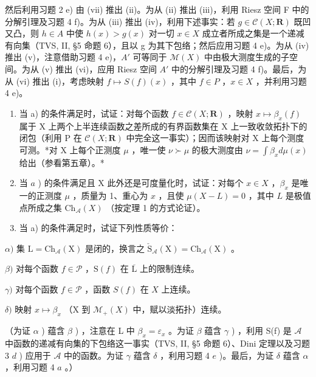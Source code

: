 然后利用习题 2 e) 由 (vii) 推出 (ii)。为从 (ii) 推出 (iii)，利用 Riesz 空间 F 中的分解引理及习题 4 f)。为从 (iii) 推出 (iv)，利用下述事实：若 \(g \in \mathcal{C}(X; \mathbf{R})\) 既凹又凸，则 \(h \in A\) 中使 \(h(x) > g(x)\) 对一切 \(x \in X\) 成立者所成之集是一个递减有向集（TVS, II, §5 命题 6），且以 g 为其下包络；然后应用习题 4 e)。为从 (iv) 推出 (v)，注意借助习题 4 e)，\(A'\) 可等同于 \(\mathcal{M}(X)\) 中由极大测度生成的子空间。为从 (v) 推出 (vi)，应用 Riesz 空间 \(A'\) 中的分解引理及习题 4 f)。最后，为从 (vi) 推出 (i)，考虑映射 \(f \mapsto S(f)(x)\) ，其中 \(f \in P\) ，\(x \in X\) ，并利用习题 4 e)。

\begin{enumerate}
\def\labelenumi{\alph{enumi})}
\setcounter{enumi}{1}
\item
  当 a) 的条件满足时，试证：对每个函数 \(f \in \mathcal{C}(X; \mathbf{R})\) ，映射 \(x \mapsto \beta_x(f)\) 属于 X 上两个上半连续函数之差所成的有界函数集在 X 上一致收敛拓扑下的闭包（利用 P 在 \(\mathcal{C}(X; \mathbf{R})\) 中完全这一事实）；因而该映射对 X 上每个测度可测。*对 X 上每个正测度 \(\mu\) ，唯一使 \(\nu \succ \mu\) 的极大测度由 \(\nu = \int \beta_x d\mu(x)\) 给出（参看第五章）。*
\item
  当 \(a\) ) 的条件满足且 X 此外还是可度量化时，试证：对每个 \(x \in X\) ，\(\beta_x\) 是唯一的正测度 \(\mu\) ，质量为 1、重心为 \(x\) ，且使 \(\mu(X - L) = 0\) ，其中 \(L\) 是极值点所成之集 \(\mathrm{Ch}_{\mathcal{A}}(X)\) （按定理 1 的方式论证）。
\item
  当 a) 的条件满足时，试证下列性质等价：
\end{enumerate}

\(\alpha)\) 集 \(\mathrm{L} = \mathrm{Ch}_{\mathcal{A}}(\mathrm{X})\) 是闭的，换言之 \(\check{\mathrm{S}}_{\mathcal{A}}(\mathrm{X}) = \mathrm{Ch}_{\mathcal{A}}(\mathrm{X})\) 。

\(\beta)\) 对每个函数 \(f \in \mathcal{P}\) ，\(\mathrm{S}(f)\) 在 \(\overline{\mathrm{L}}\) 上的限制连续。

\(\gamma)\) 对每个函数 \(f \in \mathcal{P}\) ，函数 \(S(f)\) 在 \(X\) 上连续。

\(\delta)\) 映射 \(x \mapsto \beta_x\) （X 到 \(\mathcal{M}_+(X)\) 中，赋以淡拓扑）连续。

（为证 \(\alpha\) ) 蕴含 \(\beta\) ) ，注意在 L 中 \(\beta_x = \varepsilon_x\) 。为证 \(\beta\) 蕴含 \(\gamma\) ) ，利用 S(f) 是 \(\mathcal{A}\) 中函数的递减有向集的下包络这一事实（TVS, II, §5 命题 6）、Dini 定理以及习题 3 \(d\) ) 应用于 \(\mathcal{A}\) 中的函数。为证 \(\gamma\) 蕴含 \(\delta\) ，利用习题 4 \(e\) )。最后，为证 \(\delta\) 蕴含 \(\alpha\) ，利用习题 4 \(a\) 。）

